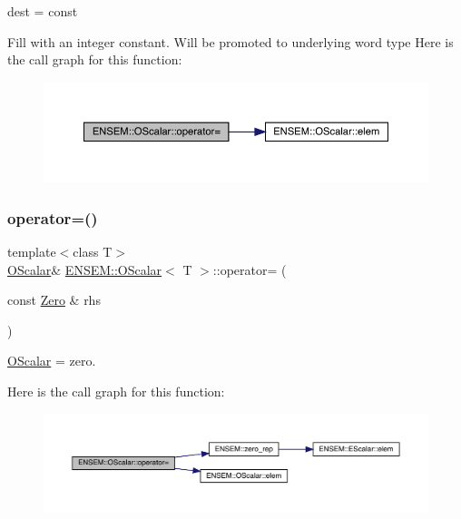 dest = const 

Fill with an integer constant. Will be promoted to underlying word type Here is the call graph for this function\+:
\nopagebreak
\begin{figure}[H]
\begin{center}
\leavevmode
\includegraphics[width=350pt]{da/d80/classENSEM_1_1OScalar_a88bbb49d2879dba60c29d7792a8af8dc_cgraph}
\end{center}
\end{figure}
\mbox{\label{classENSEM_1_1OScalar_a4fdfed29e219b358e05588826e672932}} 
\subsubsection{\texorpdfstring{operator=()}{operator=()}\hspace{0.1cm}{\footnotesize\ttfamily [4/12]}}
{\footnotesize\ttfamily template$<$class T$>$ \\
\mbox{\hyperlink{classENSEM_1_1OScalar}{O\+Scalar}}\& \mbox{\hyperlink{classENSEM_1_1OScalar}{E\+N\+S\+E\+M\+::\+O\+Scalar}}$<$ T $>$\+::operator= (\begin{DoxyParamCaption}\item[{const \mbox{\hyperlink{structENSEM_1_1Zero}{Zero}} \&}]{rhs }\end{DoxyParamCaption})\hspace{0.3cm}{\ttfamily [inline]}}



\mbox{\hyperlink{classENSEM_1_1OScalar}{O\+Scalar}} = zero. 

Here is the call graph for this function\+:
\nopagebreak
\begin{figure}[H]
\begin{center}
\leavevmode
\includegraphics[width=350pt]{da/d80/classENSEM_1_1OScalar_a4fdfed29e219b358e05588826e672932_cgraph}
\end{center}
\end{figure}
\mbox{\label{classENSEM_1_1OScalar_a4fdfed29e219b358e05588826e672932}} 
